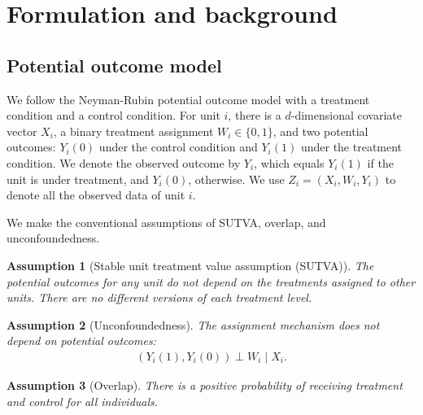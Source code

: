 \documentclass{article}
\theoremstyle{plain}
\newtheorem{assumption}{Assumption}[section]
\theoremstyle{definition}
\theoremstyle{plain}
\begin{document}
\section{Formulation and background}\label{sec:background}

\subsection{Potential outcome model}\label{sec:potential.outcome.model}

We follow the Neyman-Rubin potential outcome model with a treatment condition and a control condition.
For unit $i$, there is a $d$-dimensional covariate vector $X_i$, a binary treatment assignment $W_i \in \{0, 1\}$, and two potential outcomes: $Y_i(0)$ under the control condition and $Y_i(1)$ under the treatment condition.
We denote the observed outcome by $Y_i$, which equals $Y_i(1)$ if the unit is under treatment, and $Y_i(0)$, otherwise.
We use $Z_i = (X_i, W_i, Y_i)$ to denote all the observed data of unit $i$.


We make the conventional assumptions of SUTVA, overlap, and unconfoundedness.
\begin{assumption}[Stable unit treatment value assumption (SUTVA)]
    The potential outcomes for any unit do not depend on the treatments assigned to other units. There are no different versions of each treatment level.
\end{assumption}

\begin{assumption}[Unconfoundedness]
    The assignment mechanism does not depend on potential outcomes:
    \begin{align*}
        (Y_i(1), Y_i(0)) \perp W_i \mid X_i.
    \end{align*}
\end{assumption}

\begin{assumption}[Overlap]\label{assu:overlap}
    There is a positive probability of receiving treatment and control for all individuals.
\end{assumption}
\end{document}
